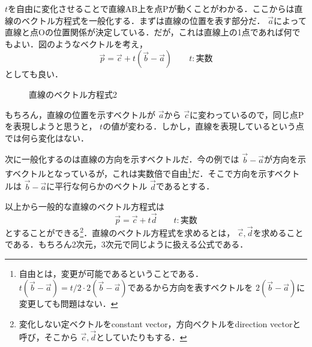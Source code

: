 \documentclass[dvipdfmx]{jsarticle}
\begin{document}
    \(t\)を自由に変化させることで直線AB上を点Pが動くことがわかる．ここからは直線のベクトル方程式を一般化する．まずは直線の位置を表す部分だ． \(\vec{a}\)によって直線と点Oの位置関係が決定している．だが，これは直線上の1点であれば何でもよい．図のようなベクトルを考え，
    \[
    \vec{p}=\vec{c} + t(\vec{b}-\vec{a})\qquad t:\text{実数}
    \]
    としても良い．

    \begin{figure}[htbp]\centering
        \caption{直線のベクトル方程式2}
        \label{tikz_vector_equation_line1_sub1}
    \end{figure}

    もちろん，直線の位置を示すベクトルが \(\vec{a}\)から \(\vec{c}\)に変わっているので，同じ点Pを表現しようと思うと， \(t\)の値が変わる．しかし，直線を表現しているという点では何ら変化はない．


    次に一般化するのは直線の方向を示すベクトルだ．今の例では \(\vec{b}-\vec{a}\)が方向を示すベクトルとなっているが，これは実数倍で自由\footnote{自由とは，変更が可能であるということである． \(t(\vec{b}-\vec{a})=t/2\cdot 2(\vec{b}-\vec{a})\)であるから方向を表すベクトルを \(2(\vec{b}-\vec{a})\)に変更しても問題はない．}だ．そこで方向を示すベクトルは \(\vec{b}-\vec{a}\)に平行な何らかのベクトル \(\vec{d}\)であるとする．

    以上から一般的な直線のベクトル方程式は
    \begin{equation}
        \vec{p}=\vec{c}+t\vec{d}\qquad t:\text{実数}
        \label{eq_vector_equation_line1}
    \end{equation}
    とすることができる\footnote{変化しない定ベクトルをconstant vector，方向ベクトルをdirection vectorと呼び，そこから \(\vec{c},\vec{d}\)としていたりもする．}．直線のベクトル方程式を求めるとは， \(\vec{c},\vec{d}\)を求めることである．もちろん2次元，3次元で同じように扱える公式である．
\end{document}
